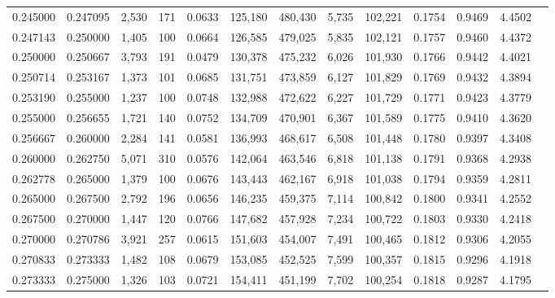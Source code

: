 \begin{tabular}{rrrrrrrrrrrrr}
0.245000 & 0.247095 & 2,530 & 171 &                                     0.0633 & 125,180 & 480,430 &   5,735 & 102,221 & 0.1754 & 0.9469 & 4.4502 \\
0.247143 & 0.250000 & 1,405 & 100 &                                     0.0664 & 126,585 & 479,025 &   5,835 & 102,121 & 0.1757 & 0.9460 & 4.4372 \\
0.250000 & 0.250667 & 3,793 & 191 &                                     0.0479 & 130,378 & 475,232 &   6,026 & 101,930 & 0.1766 & 0.9442 & 4.4021 \\
0.250714 & 0.253167 & 1,373 & 101 &                                     0.0685 & 131,751 & 473,859 &   6,127 & 101,829 & 0.1769 & 0.9432 & 4.3894 \\
0.253190 & 0.255000 & 1,237 & 100 &                                     0.0748 & 132,988 & 472,622 &   6,227 & 101,729 & 0.1771 & 0.9423 & 4.3779 \\
0.255000 & 0.256655 & 1,721 & 140 &                                     0.0752 & 134,709 & 470,901 &   6,367 & 101,589 & 0.1775 & 0.9410 & 4.3620 \\
0.256667 & 0.260000 & 2,284 & 141 &                                     0.0581 & 136,993 & 468,617 &   6,508 & 101,448 & 0.1780 & 0.9397 & 4.3408 \\
0.260000 & 0.262750 & 5,071 & 310 &                                     0.0576 & 142,064 & 463,546 &   6,818 & 101,138 & 0.1791 & 0.9368 & 4.2938 \\
0.262778 & 0.265000 & 1,379 & 100 &                                     0.0676 & 143,443 & 462,167 &   6,918 & 101,038 & 0.1794 & 0.9359 & 4.2811 \\
0.265000 & 0.267500 & 2,792 & 196 &                                     0.0656 & 146,235 & 459,375 &   7,114 & 100,842 & 0.1800 & 0.9341 & 4.2552 \\
0.267500 & 0.270000 & 1,447 & 120 &                                     0.0766 & 147,682 & 457,928 &   7,234 & 100,722 & 0.1803 & 0.9330 & 4.2418 \\
0.270000 & 0.270786 & 3,921 & 257 &                                     0.0615 & 151,603 & 454,007 &   7,491 & 100,465 & 0.1812 & 0.9306 & 4.2055 \\
0.270833 & 0.273333 & 1,482 & 108 &                                     0.0679 & 153,085 & 452,525 &   7,599 & 100,357 & 0.1815 & 0.9296 & 4.1918 \\
0.273333 & 0.275000 & 1,326 & 103 &                                     0.0721 & 154,411 & 451,199 &   7,702 & 100,254 & 0.1818 & 0.9287 & 4.1795 \\

\end{tabular}

